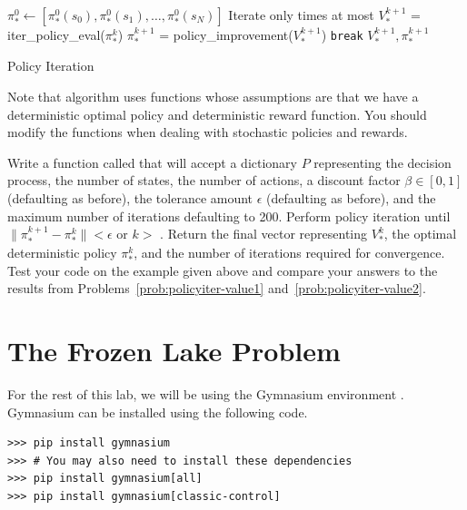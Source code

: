\begin{algorithm}[H]
\begin{algorithmic}[1]
    \State $\pi_*^0 \gets [\pi_*^0(s_0),\pi_*^0(s_1),\ldots,\pi_*^0(s_N)] $
        \Comment Iterate only  times at most
        \State $V_*^{k+1}$ = iter\_policy\_eval($\pi_*^{k}$)
        \State $\pi_*^{k+1}$ = policy\_improvement($V_*^{k+1}$)
            \State \texttt{break}
        \EndIf
    \EndFor
    \State {} $V_*^{k+1}, \pi_*^{k+1}$
\EndProcedure
\end{algorithmic}
\caption{Policy Iteration}
\label{alg:PolicyIteration}
\end{algorithm}
Note that algorithm uses functions whose assumptions are that we have a deterministic optimal policy and deterministic reward function.
You should modify the functions when dealing with stochastic policies and rewards.

\begin{problem}
\label{prob:policyiter-value4}
Write a function called  that will accept a dictionary $P$ representing the decision process, the number of states, the number of actions, a discount factor $\beta \in [0,1]$ (defaulting as before), the tolerance amount $\epsilon$ (defaulting as before), and the maximum number of iterations  defaulting to 200.
Perform policy iteration until $\|\pi_*^{k+1} - \pi_*^{k}\| < \epsilon$ or $k > $ .
Return the final vector representing $V_*^k$, the optimal deterministic policy $\pi_*^k$, and the number of iterations required for convergence.
Test your code on the example given above and compare your answers to the results from Problems\ \ref{prob:policyiter-value1} and\ \ref{prob:policyiter-value2}.
\end{problem}

\section*{The Frozen Lake Problem}
For the rest of this lab, we will be using the Gymnasium environment .
Gymnasium can be installed using the following code.
\begin{lstlisting}
>>> pip install gymnasium
>>> # You may also need to install these dependencies
>>> pip install gymnasium[all]
>>> pip install gymnasium[classic-control]
\end{lstlisting}

